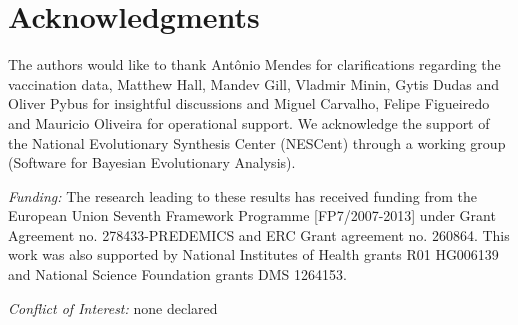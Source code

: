 \documentclass[10pt]{article}
\begin{document}
\section*{Acknowledgments}
The authors would like to thank Ant\^onio Mendes for clarifications regarding the vaccination data, Matthew Hall, Mandev Gill, Vladmir Minin, Gytis Dudas and Oliver Pybus for insightful discussions and Miguel Carvalho, Felipe Figueiredo and Mauricio Oliveira for operational support.
We acknowledge the support of the National Evolutionary Synthesis Center (NESCent) through a working group (Software for Bayesian Evolutionary Analysis).

\emph{Funding:} The research leading to these results has received funding from the European Union Seventh Framework Programme [FP7/2007-2013] under Grant Agreement no. 278433-PREDEMICS and ERC Grant agreement no. 260864.
This work was also supported by National Institutes of Health grants R01 HG006139 and National Science Foundation grants DMS 1264153.

\emph{Conflict of Interest:} none declared
\end{document}
